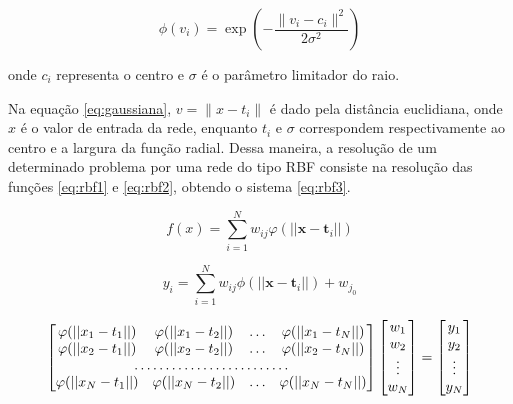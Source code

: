 \documentclass[qual, classic, a4paper]{ufbathesis}
\begin{document}
\begin{equation} \label{eq:gaussiana}
    \phi (v_{i})=\exp \left(-{\frac  {\|v_{i}-c_{i}\|^{2}}{2\sigma ^{2}}}\right)
\end{equation}

onde $c_i$ representa o centro e $\sigma$ é o parâmetro limitador do raio.

Na equação \ref{eq:gaussiana}, $v = \lVert x - t_i \rVert$ é dado pela distância euclidiana, onde $x$ é o valor de entrada da rede, 
enquanto $t_i$ e $\sigma$ correspondem respectivamente ao centro e a largura da função radial. 
Dessa maneira, a resolução de um determinado problema por uma rede do tipo RBF consiste na resolução das funções \ref{eq:rbf1} e
\ref{eq:rbf2}, obtendo o sistema \ref{eq:rbf3}.

\begin{equation} \label{eq:rbf1}
    f(x)=\sum _{{i=1}}^{N}w_{ij}\varphi (||{\mathbf  {x}}-{\mathbf  {t}}_{i}||)
\end{equation}

\begin{equation} \label{eq:rbf2}
    y_i=\sum _{{i=1}}^{N}w_{ij}\phi (||{\mathbf  {x}}-{\mathbf  {t}}_{i}||) + w_{j_0}
\end{equation}

\begin{equation} \label{eq:rbf3}
\begin{bmatrix}
    \varphi (||{{x_1}}-{{t}}_{1}||) & \varphi (||{{x_1}}-{{t}}_{2}||) & \dots & \varphi (||{{x_1}}-{{t}}_{N}||) \\
    \varphi (||{{x_2}}-{{t}}_{1}||) & \varphi (||{{x_2}}-{{t}}_{2}||) & \dots & \varphi (||{{x_2}}-{{t}}_{N}||) \\
    \hdotsfor{5} \\
    \varphi (||{{x_N}}-{{t}}_{1}||) & \varphi (||{{x_N}}-{{t}}_{2}||) & \dots & \varphi (||{{x_N}}-{{t}}_{N}||)
\end{bmatrix}
\begin{bmatrix}
    w_1 \\
    w_2 \\
    \vdots \\
    w_N \\
\end{bmatrix}
=
\begin{bmatrix}
    y_1 \\
    y_2 \\
    \vdots \\
    y_N \\
\end{bmatrix}
\end{equation}
\end{document}
